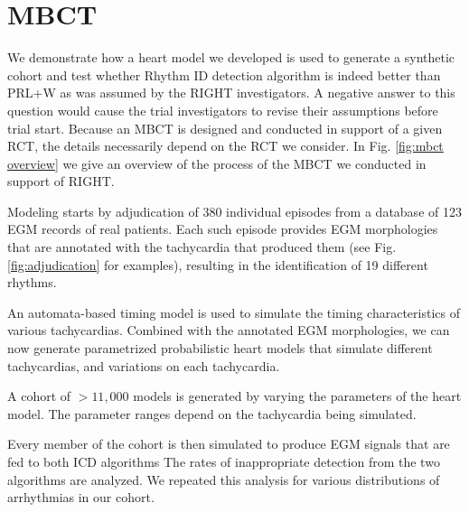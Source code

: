\section{\acl{MBCT}}
\label{sec:mbct}

We demonstrate how a heart model we developed is used to generate a synthetic cohort and test whether Rhythm ID detection algorithm is indeed better than PRL+W as was assumed by the RIGHT investigators.
A negative answer to this question would cause the trial investigators to revise their assumptions before trial start.
Because an \ac{MBCT} is designed and conducted in support of a given \ac{RCT}, the details necessarily depend on the \ac{RCT} we consider.
In Fig. \ref{fig:mbct overview} we give an overview of the process of the \ac{MBCT} we conducted in support of RIGHT.

 Modeling starts by adjudication of 380 individual episodes from a database of 123 \ac{EGM} records of real patients.
Each such episode provides \ac{EGM} morphologies that are annotated with the tachycardia that produced them (see Fig. \ref{fig:adjudication} for examples), resulting in the identification of 19 different rhythms.

 An automata-based timing model is used to simulate the timing characteristics of various tachycardias.
Combined with the annotated EGM morphologies, we can now generate parametrized probabilistic heart models that simulate different tachycardias, and variations on each tachycardia.

 A cohort of $>11,000$ models is generated by varying the parameters of the heart model. 
The parameter ranges depend on the tachycardia being simulated.

 Every member of the cohort is then simulated to produce \ac{EGM} signals that are fed to both ICD algorithms
The rates of inappropriate detection from the two algorithms are analyzed.
We repeated this analysis for various distributions of arrhythmias in our cohort.

